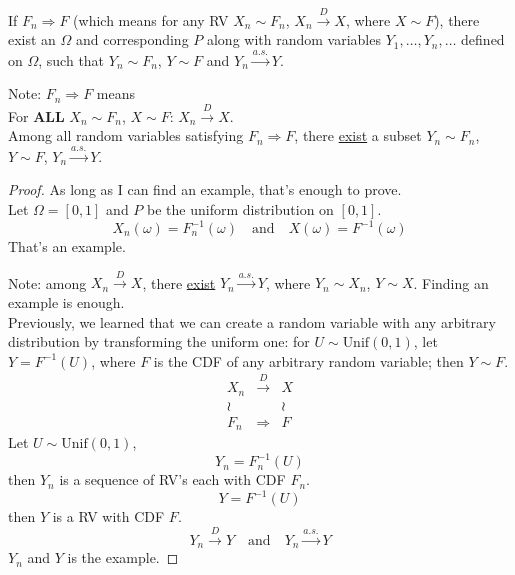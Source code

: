 \begin{theorem}
    If $F_n \Rightarrow F$ (which means for any RV $X_n \sim F_n$, $X_n \overset{D}{\longrightarrow} X$, where $X \sim F$), there exist an $\Omega$ and corresponding $P$ along with random variables $Y_1, \dots, Y_n, \dots$ defined on $\Omega$, such that $Y_n \sim F_n$, $Y \sim F$ and $Y_n \overset{a.s.}{\longrightarrow} Y$.
\end{theorem}
Note: $F_n \Rightarrow F$ means
\\For \textbf{ALL} $X_n \sim F_n$, $X \sim F$: $X_n \overset{D}{\longrightarrow} X$.
\\{\color{red!70!black}Among all random variables satisfying $F_n \Rightarrow F$, there \underline{exist} a subset $Y_n \sim F_n$, $Y \sim F$, $Y_n \overset{a.s.}{\longrightarrow} Y$.}
\begin{proof}
    As long as I can find an example, that's enough to prove.
    \\Let $\Omega = [0,1]$ and $P$ be the uniform distribution on $[0,1]$.
    \[X_n(\omega) = F_n^{-1}(\omega) \quad \text{and} \quad X(\omega) = F^{-1}(\omega)\]
    That's an example.

    Note: among $X_n \overset{D}{\longrightarrow} X$, there \underline{exist} $Y_n \overset{a.s.}{\longrightarrow} Y$, where $Y_n \sim X_n$, $Y \sim X$. Finding an example is enough.
    \\Previously, we learned that we can create a random variable with any arbitrary distribution by transforming the uniform one: for $U \sim \text{Unif}(0,1)$, let $Y = F^{-1}(U)$, where $F$ is the CDF of any arbitrary random variable; then $Y \sim F$.
    \[\begin{array}{ccc}
        X_n & \overset{D}{\longrightarrow} & X\\
        \wr & & \wr\\
        F_n & \Rightarrow & F
    \end{array}\]
    Let $U \sim \text{Unif}(0,1)$,
    \[Y_n = F_n^{-1}(U)\]
    then $Y_n$ is a sequence of RV's each with CDF $F_n$.
    \[Y = F^{-1}(U)\]
    then $Y$ is a RV with CDF $F$.
    \[Y_n \overset{D}{\longrightarrow} Y \quad \text{and} \quad Y_n \overset{a.s.}{\longrightarrow} Y\]
    $Y_n$ and $Y$ is the example.
\end{proof}

